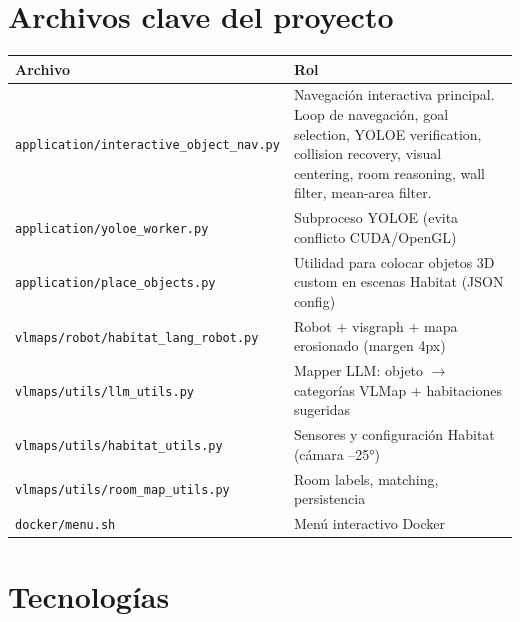 \documentclass[11pt,a4paper]{article}
\begin{document}
\section{Archivos clave del proyecto}

\begin{table}[h]
\centering
\small
\begin{tabular}{p{9cm}p{5cm}}
\toprule
\textbf{Archivo} & \textbf{Rol} \\
\midrule
\texttt{application/interactive\_object\_nav.py} & Navegación interactiva principal. Loop de navegación, goal selection, YOLOE verification, collision recovery, visual centering, room reasoning, wall filter, mean-area filter. \\
\texttt{application/yoloe\_worker.py} & Subproceso YOLOE (evita conflicto CUDA/OpenGL) \\
\texttt{application/place\_objects.py} & Utilidad para colocar objetos 3D custom en escenas Habitat (JSON config) \\
\texttt{vlmaps/robot/habitat\_lang\_robot.py} & Robot + visgraph + mapa erosionado (margen 4px) \\
\texttt{vlmaps/utils/llm\_utils.py} & Mapper LLM: objeto $\rightarrow$ categorías VLMap + habitaciones sugeridas \\
\texttt{vlmaps/utils/habitat\_utils.py} & Sensores y configuración Habitat (cámara --25°) \\
\texttt{vlmaps/utils/room\_map\_utils.py} & Room labels, matching, persistencia \\
\texttt{docker/menu.sh} & Menú interactivo Docker \\
\bottomrule
\end{tabular}
\end{table}

\section{Tecnologías}
\end{document}
